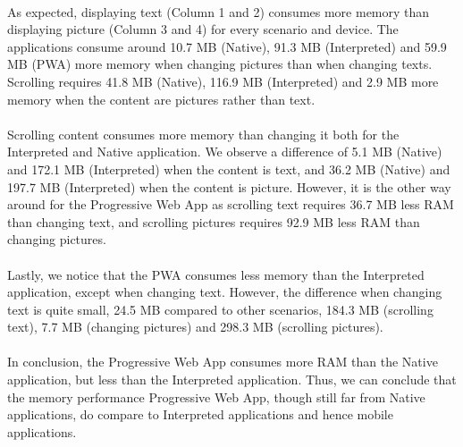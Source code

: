 \documentclass{kththesis}
\begin{document}
\paragraph{}
As expected, displaying text (Column 1 and 2) consumes more memory than displaying picture (Column 3 and 4) for every scenario and device. The applications consume around 10.7 MB (Native), 91.3 MB (Interpreted) and 59.9 MB (PWA) more memory when changing pictures than when changing texts. Scrolling requires 41.8 MB (Native), 116.9 MB (Interpreted) and 2.9 MB more memory when the content are pictures rather than text. 

\paragraph{}
Scrolling content consumes more memory than changing it both for the Interpreted and Native application. We observe a difference of 5.1 MB (Native) and 172.1 MB (Interpreted) when the content is text, and 36.2 MB (Native) and 197.7 MB (Interpreted) when the content is picture. However, it is the other way around for the Progressive Web App as scrolling text requires 36.7 MB less RAM than changing text, and scrolling pictures requires 92.9 MB less RAM than changing pictures.

\paragraph{}
Lastly, we notice that the PWA consumes less memory than the Interpreted application, except when changing text. However, the difference when changing text is quite small, 24.5 MB compared to other scenarios, 184.3 MB (scrolling text), 7.7 MB (changing pictures) and 298.3 MB (scrolling pictures). 

\paragraph{}
In conclusion, the Progressive Web App consumes more RAM than the Native application, but less than the Interpreted application. Thus, we can conclude that the memory performance Progressive Web App, though still far from Native applications, do compare to Interpreted applications and hence mobile applications. 
\end{document}
